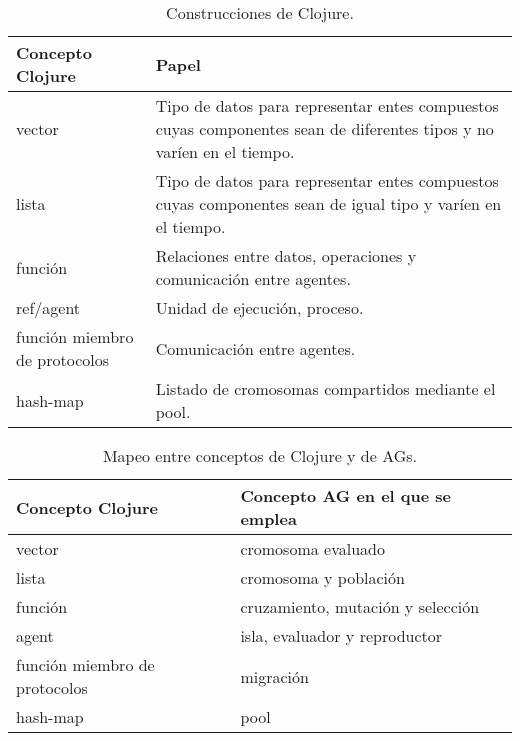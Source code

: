 \begin{table}
  \centering
   \caption{Construcciones de Clojure.}\label{cljComp}
\begin{tabular}{|p{3.4cm}|p{7cm}|}
  \hline
  \textbf{Concepto Clojure} & \textbf{Papel} \\
     \hline
   vector & Tipo de datos para representar entes compuestos cuyas componentes sean de diferentes tipos y no varíen en el tiempo. \\
     \hline
  lista & Tipo de datos para representar entes compuestos cuyas componentes sean de igual tipo y varíen en el tiempo.\\
     \hline
  función & Relaciones entre datos, operaciones y comunicación entre agentes. \\
     \hline
  ref/agent & Unidad de ejecución, proceso. \\
     \hline
  función miembro de protocolos & Comunicación entre agentes.  \\
     \hline
  hash-map & Listado de cromosomas compartidos mediante el pool. \\
     \hline
\end{tabular}

\end{table}

\begin{table}
  \centering
  \caption{Mapeo entre conceptos de Clojure y de AGs.}\label{cljAGRelation}
\begin{tabular}{|p{3cm}|p{6cm}|}
  \hline
  \textbf{Concepto Clojure} & \textbf{Concepto AG en el que se emplea} \\
     \hline
  vector & cromosoma evaluado \\
     \hline
  lista & cromosoma y población \\
     \hline
  función & cruzamiento, mutación y selección \\
     \hline
  agent  & isla, evaluador y reproductor \\
     \hline
  función miembro de protocolos & migración \\
     \hline
 hash-map & pool \\
     \hline
\end{tabular}

\end{table}

